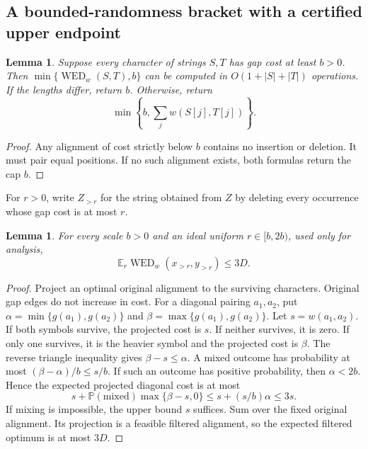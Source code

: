 \documentclass[11pt]{article}
\newtheorem{lemma}[theorem]{Lemma}
\theoremstyle{definition}
\newcommand{\WED}{\operatorname{WED}}
\newcommand{\E}{\mathbb E}
\newcommand{\Prb}{\mathbb P}
\newcommand{\1}{\mathbf 1}
\begin{document}
\subsection{A bounded-randomness bracket with a certified upper endpoint}

\begin{lemma}\label{wrapper:lem:nogap}
Suppose every character of strings $S,T$ has gap cost at least $b>0$.
Then $\min\{\WED_w(S,T),b\}$ can be computed in $O(1+|S|+|T|)$ operations.
If the lengths differ, return $b$. Otherwise, return
\[
\min\left\{b,\sum_jw(S[j],T[j])\right\}.
\]
\end{lemma}
\begin{proof}
Any alignment of cost strictly below $b$ contains no insertion or deletion.
It must pair equal positions. If no such alignment exists, both formulas
return the cap $b$.
\end{proof}

For $r>0$, write $Z_{>r}$ for the string obtained from $Z$ by deleting
every occurrence whose gap cost is at most $r$.

\begin{lemma}\label{wrapper:lem:simplify}
For every scale $b>0$ and an ideal uniform $r\in[b,2b)$, used only for analysis,
\[
\E_r\WED_w(x_{>r},y_{>r})\le3D.
\]
\end{lemma}
\begin{proof}
Project an optimal original alignment to the surviving characters.
Original gap edges do not increase in cost. For a diagonal pairing $a_1,a_2$,
put $\alpha=\min\{g(a_1),g(a_2)\}$ and $\beta=\max\{g(a_1),g(a_2)\}$.
Let $s=w(a_1,a_2)$. If both symbols survive, the projected cost is $s$.
If neither survives, it is zero. If only one survives, it is the heavier
symbol and the projected cost is $\beta$. The reverse triangle inequality
gives $\beta-s\le\alpha$. A mixed outcome has probability at most
$(\beta-\alpha)/b\le s/b$. If such an outcome has positive probability,
then $\alpha<2b$. Hence the expected projected diagonal cost is at most
\[
 s+\Prb(\text{mixed})\max\{\beta-s,0\}
 \le s+(s/b)\alpha\le3s.
\]
If mixing is impossible, the upper bound $s$ suffices. Sum over the fixed
original alignment. Its projection is a feasible filtered alignment, so
the expected filtered optimum is at most $3D$.
\end{proof}
\end{document}
